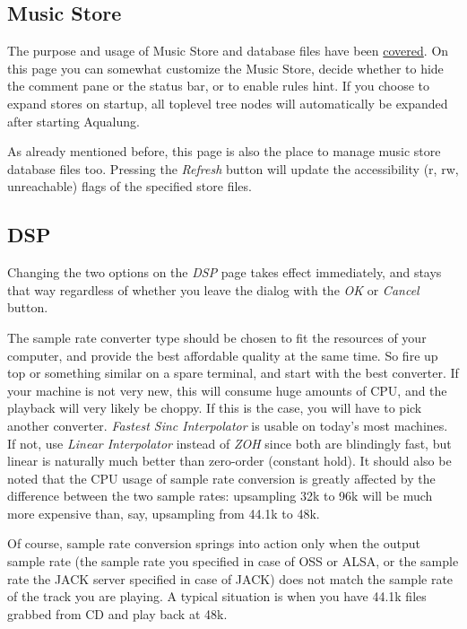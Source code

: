 \documentclass[10pt,english]{article}
\begin{document}
\subsection{Music Store\label{idp859120}}



\noindent The purpose and usage of Music Store and database files
have been \hyperref[idp191088]{\color{blue}covered}. On this page you
can somewhat customize the Music Store, decide whether to hide
the comment pane or the status bar, or to enable rules
hint. If you choose to expand stores on startup, all toplevel
tree nodes will automatically be expanded after starting
Aqualung.




As already mentioned before, this page is also the place to
manage music store database files too. Pressing the
\textsl{Refresh} button will update the accessibility (r,
rw, unreachable) flags of the specified store files.




\subsection{DSP\label{idp862496}}



\noindent Changing the two options on the \textsl{DSP} page takes
effect immediately, and stays that way regardless of whether
you leave the dialog with the \textsl{OK} or
\textsl{Cancel} button.




The sample rate converter type should be chosen to fit the
resources of your computer, and provide the best affordable
quality at the same time. So fire up top or something similar
on a spare terminal, and start with the best converter. If
your machine is not very new, this will consume huge amounts
of CPU, and the playback will very likely be choppy. If this
is the case, you will have to pick another
converter. \textsl{Fastest Sinc Interpolator} is usable on
today's most machines. If not, use \textsl{Linear
Interpolator} instead of \textsl{ZOH} since both are
blindingly fast, but linear is naturally much better than
zero-order (constant hold). It should also be noted that the
CPU usage of sample rate conversion is greatly affected by the
difference between the two sample rates: upsampling 32k to 96k
will be much more expensive than, say, upsampling from 44.1k
to 48k.




Of course, sample rate conversion springs into action only
when the output sample rate (the sample rate you specified in
case of OSS or ALSA, or the sample rate the JACK server
specified in case of JACK) does not match the sample rate of
the track you are playing. A typical situation is when you
have 44.1k files grabbed from CD and play back at 48k.
\end{document}
